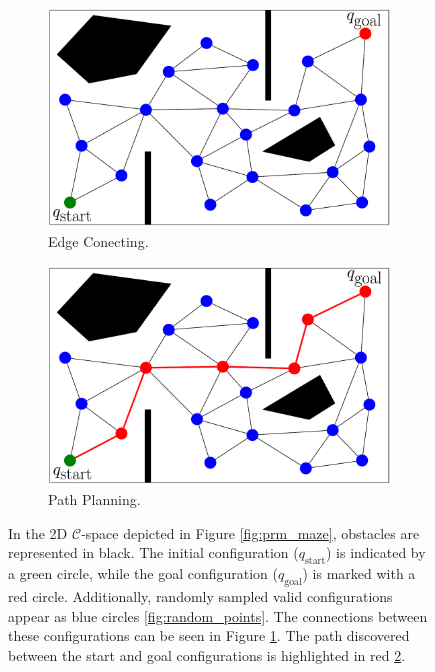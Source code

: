 \documentclass{ctuthesis}
\begin{document}
\begin{figure}[!ht]
\begin{subfigure}[b]{0.45\textwidth}
      \includegraphics[width=\textwidth]{figChap3/PRMconnecting40pt.pdf}
      \caption{Edge Conecting.}
      \label{fig:edges}
  \end{subfigure}
  \begin{subfigure}[b]{0.45\textwidth}
    \includegraphics[width=\textwidth]{figChap3/PRMpathFinding40pt.pdf}
    \caption{Path Planning.}
    \label{fig:prm_path_planning}
  \end{subfigure}
  \caption{
    In the 2D $\mathcal{C}$-space depicted in Figure \ref{fig:prm_maze}, 
    obstacles are represented in black. 
    The initial configuration ($q_{\text{start}}$) is indicated by a green circle, 
    while the goal configuration ($q_{\text{goal}}$) is marked with a red circle.
    Additionally, randomly sampled valid configurations appear as blue circles \ref{fig:random_points}. 
    The connections between these configurations can be seen in Figure \ref{fig:edges}.
    The path discovered between the start and goal configurations is highlighted in red \ref{fig:prm_path_planning}.}
  \label{fig:PRM_explanation}
\end{figure} 
\end{document}
